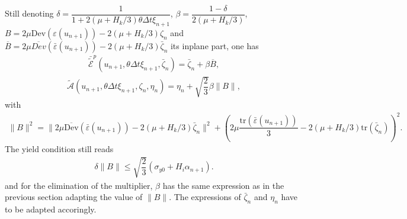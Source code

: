\documentclass[a4paper,11pt,english]{sphinxmanual}
\begin{document}
Still denoting  \(\delta = \dfrac{1}{1+2(\mu+H_k/3)\theta\Delta t\xi_{n+1}}\), \(\beta = \dfrac{1-\delta}{2(\mu+H_k/3)}\), \(B = 2\mu\mbox{Dev}(\varepsilon(u_{n+1}))-2(\mu+H_k/3)\zeta_n\) and \(\overline{B} = 2\mu\overline{Dev}(\bar{\varepsilon}(u_{n+1}))-2(\mu+H_k/3)\bar{\zeta}_n\) its in\sphinxhyphen{}plane part, one has
\begin{equation*}
\begin{split}\bar{\tilde{\mathscr E}}^p(u_{n+1}, \theta\Delta t \xi_{n+1}, \bar{\zeta}_n) = \bar{\zeta}_n + \beta \overline{B},\end{split}
\end{equation*}\begin{equation*}
\begin{split}\tilde{\mathscr A}(u_{n+1}, \theta \Delta t \xi_{n+1}, \zeta_{n}, \eta_n) = \eta_n + \sqrt{\dfrac{2}{3}}\beta\|B\|,\end{split}
\end{equation*}
with
\begin{equation*}
\begin{split}\|B\|^2 = \|2\mu\overline{\mbox{Dev}}(\bar{\varepsilon}(u_{n+1})) - 2(\mu+H_k/3)\bar{\zeta}_n\|^2 + \left(2\mu\dfrac{\mbox{tr}(\bar{\varepsilon}(u_{n+1}))}{3} -2(\mu+H_k/3)\mbox{tr}(\bar{\zeta}_n) \right)^2.\end{split}
\end{equation*}
The yield condition still reads
\begin{equation*}
\begin{split}\delta \|B\| \le \sqrt{\dfrac{2}{3}}(\sigma_{y0}+H_i \alpha_{n+1}).\end{split}
\end{equation*}
and for the elimination of the multiplier, \(\beta\) has the same expression as in the previous section adapting the value of \(\|B\|\). The expressions of \(\bar{\zeta}_n\) and \(\eta_n\) have to be adapted accoringly.
\end{document}
